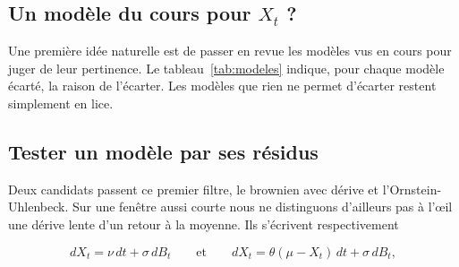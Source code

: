 \documentclass[11pt,a4paper]{article}
\begin{document}
\subsection*{Un modèle du cours pour $X_t$ ?}

Une première idée naturelle est de passer en revue les modèles vus en cours pour juger de leur pertinence. Le tableau~\ref{tab:modeles} indique, pour chaque modèle écarté, la raison de l'écarter. Les modèles que rien ne permet d'écarter restent simplement en lice.

\begin{table}[ht]
  \centering
  \caption{Modèles vus en cours et leur pertinence pour $(X_t)$. On ne justifie que les rejets ; les modèles retenus sont simplement ceux que rien ne permet d'écarter à ce stade.}
  \label{tab:modeles}
\end{table}

\subsection*{Tester un modèle par ses résidus}

Deux candidats passent ce premier filtre, le brownien avec dérive et l'Ornstein-Uhlenbeck. Sur une fenêtre aussi courte nous ne distinguons d'ailleurs pas à l'œil une dérive lente d'un retour à la moyenne. Ils s'écrivent respectivement

\begin{equation}\label{eq:modeles}
  dX_t = \nu\,dt + \sigma\,dB_t \qquad \text{et} \qquad dX_t = \theta(\mu - X_t)\,dt + \sigma\,dB_t,
\end{equation}
\end{document}
